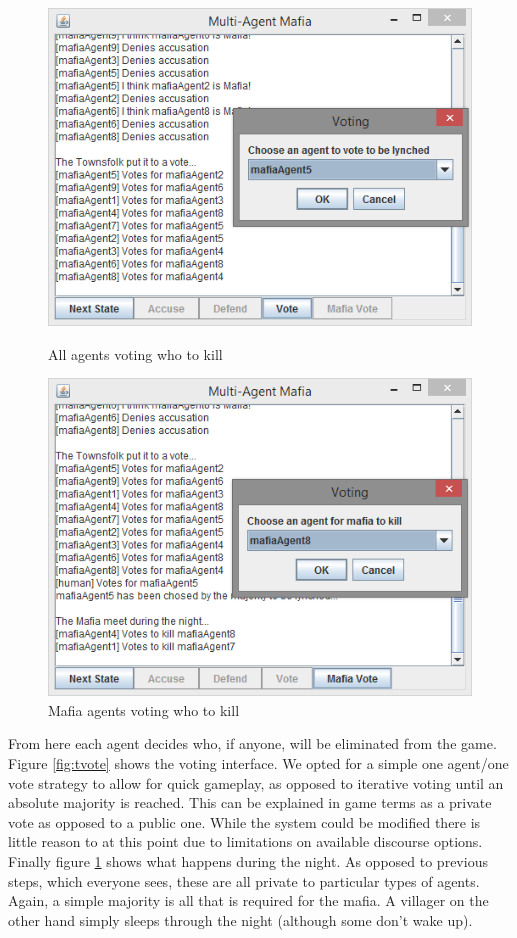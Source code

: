 \documentclass[12pt]{article} %
\begin{document}
\begin{figure}[H]
\centering
\begin{minipage}{0.49\textwidth}
\centering
\includegraphics[width=\linewidth]{mafia-townvote}
\caption{All agents voting who to kill}
\label{fig:tvote}
\end{minipage}\hfill
\begin{minipage}{0.49\textwidth}
\centering
\includegraphics[width=\linewidth]{mafia-mafiavote}
\caption{Mafia agents voting who to kill}
\label{fig:mvote}
\end{minipage}
\end{figure}

From here each agent decides who, if anyone, will be eliminated from the game. Figure \ref{fig:tvote} shows the voting interface. We opted for a simple one agent/one vote strategy to allow for quick gameplay, as opposed to iterative voting until an absolute majority is reached. This can be explained in game terms as a private vote as opposed to a public one. While the system could be modified there is little reason to at this point due to limitations on available discourse options. Finally figure \ref{fig:mvote} shows what happens during the night. As opposed to previous steps, which everyone sees, these are all private to particular types of agents. Again, a simple majority is all that is required for the mafia. A villager on the other hand simply sleeps through the night (although some don't wake up).
\end{document}
